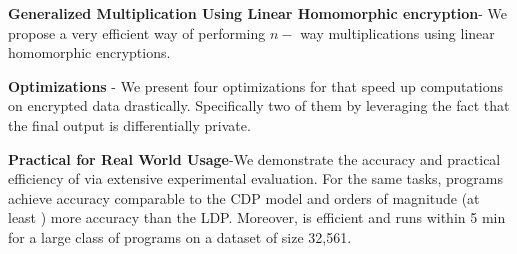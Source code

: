 	\item \textbf{Generalized Multiplication Using Linear Homomorphic encryption}- We propose a very efficient way of performing $n-$ way multiplications using linear homomorphic encryptions.
	\item \textbf{Optimizations} - We present four optimizations for \system that speed up computations on encrypted data drastically. Specifically two of them  by leveraging the fact that the final output is differentially private. 
	\item \textbf{Practical for Real World Usage}-We demonstrate the accuracy and practical efficiency of \system via extensive experimental evaluation. For the same tasks, \system programs achieve accuracy comparable to the \textsf{CDP} model and orders of magnitude (at least ) more accuracy than the \textsf{LDP}. Moreover, \system is efficient and runs within 5 min for a large class of programs on a dataset of size 32,561. 
\squishend




